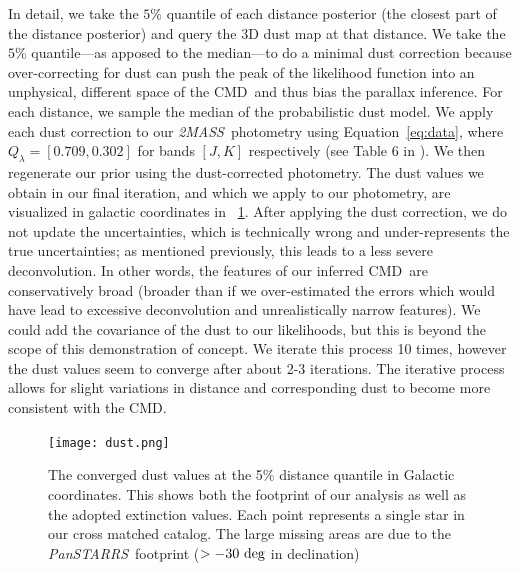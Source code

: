 \documentclass[modern]{aastex61}
\newcommand{\acronym}[1]{{\small{#1}}}
\newcommand{\project}[1]{\textsl{#1}}
\newcommand{\tmass}{\project{\acronym{2MASS}}}
\newcommand{\panstarrs}{\project{Pan\acronym{STARRS}}}
\newcommand{\cmd}{\acronym{CMD}}
\begin{document}
In detail, we take the $5\%$
quantile of each distance posterior (the closest part of the
distance posterior) and query the 3D dust map at that distance.
We take the $5\%$ quantile---as apposed to the median---to do a minimal dust
correction because over-correcting for dust can push the peak of the likelihood
function into an unphysical, different space of the \cmd\ and thus bias the
parallax inference.
For each distance, we sample the median of the
probabilistic dust model. We apply each dust correction to our
\tmass\ photometry using Equation~\ref{eq:data}, where $Q_{\lambda}
= [0.709, 0.302]$ for bands $[J, K]$ respectively (see Table 6 in
\citealt{schlafly11}).
We then regenerate our prior using the dust-corrected photometry.
The dust values we obtain in our final
iteration, and which we apply to our photometry, are visualized in
galactic coordinates in \figurename~\ref{fig:dust}.
After applying the dust correction, we do not update the uncertainties, which is
technically wrong and under-represents the true uncertainties; as mentioned
previously, this leads to a less severe deconvolution.
In other words, the features of our inferred
  \cmd\ are conservatively broad (broader than if we over-estimated
  the errors which would have lead to excessive deconvolution and
  unrealistically narrow features). We could add the covariance of
the dust to our likelihoods, but this is beyond the scope of this
demonstration of concept. We iterate this process 10 times, however
the dust values seem to converge after about 2-3 iterations. The
iterative process allows for slight variations in distance and
corresponding dust to become more consistent with the \cmd.
\begin{figure}
\centering
  \texttt{[image: dust.png]}
\caption{The converged dust values at the 5\% distance quantile in Galactic coordinates. This shows both the footprint of our analysis as well as the adopted extinction values. Each point represents a single star in our cross matched catalog. The large missing areas are due to the \panstarrs\ footprint ($>-30~{\rm deg}$ in declination)}
\label{fig:dust}
\end{figure}
\end{document}
